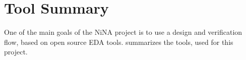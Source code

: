 
\section{Tool Summary}
\label{tools}

One of the main goals of the NiNA project is to use a design and verification flow,
based on open source EDA tools.  summarizes the tools, used for
this project. 

